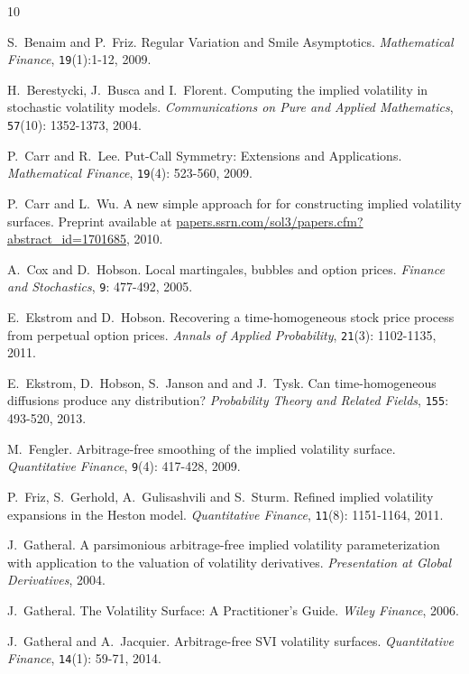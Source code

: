 \documentclass{amsart}[11pt]
\numberwithin{equation}{section}
\theoremstyle{definition}
\begin{document}
\begin{thebibliography}{10}

S.~Benaim and P.~Friz.
Regular Variation and Smile Asymptotics.
\textit{Mathematical Finance}, {\tt 19}(1):1-12, 2009.

H.~Berestycki, J.~Busca and I.~Florent. 
Computing the implied volatility in stochastic volatility models. 
\textit{Communications on Pure and Applied Mathematics}, {\tt 57}(10): 1352-1373, 2004.

P.~Carr and R.~Lee.
Put-Call Symmetry: Extensions and Applications.
\textit{Mathematical Finance}, {\tt 19}(4): 523-560, 2009.

P.~Carr and L.~Wu.
A new simple approach for for constructing implied volatility surfaces.
Preprint available at 
\href{http://papers.ssrn.com/sol3/papers.cfm?abstract\_id=1701685}{papers.ssrn.com/sol3/papers.cfm?abstract\_id=1701685}, 2010.

A.~Cox and D.~Hobson.
Local martingales, bubbles and option prices.
\textit{Finance and Stochastics}, {\tt 9}: 477-492, 2005.

E.~Ekstrom and D.~Hobson.
Recovering a time-homogeneous stock price process from perpetual option prices. 
\textit{Annals of Applied Probability}, {\tt 21}(3): 1102-1135, 2011.

E.~Ekstrom, D.~Hobson, S.~Janson and and J.~Tysk.
Can time-homogeneous diffusions produce any distribution?
\textit{Probability Theory and Related Fields}, {\tt 155}: 493-520, 2013.

M.~Fengler.
Arbitrage-free smoothing of the implied volatility surface.
\textit{Quantitative Finance}, {\tt 9}(4): 417-428, 2009.

 P.~Friz, S.~Gerhold, A.~Gulisashvili and S.~Sturm. 
Refined implied volatility expansions in the Heston model. 
\textit{Quantitative Finance}, {\tt 11}(8): 1151-1164, 2011.

J.~Gatheral.
A parsimonious arbitrage-free implied volatility parameterization with application to the valuation of volatility derivatives.
\textit{Presentation at Global Derivatives}, 2004.

J.~Gatheral.
The Volatility Surface: A Practitioner's Guide.
\textit{Wiley Finance}, 2006.

J.~Gatheral and A.~Jacquier.
Arbitrage-free SVI volatility surfaces.
\textit{Quantitative Finance}, {\tt 14}(1): 59-71, 2014.


\end{thebibliography}
\end{document}
